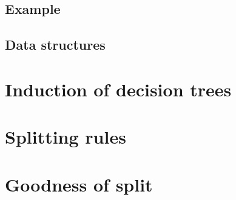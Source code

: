 


\subsection{Example}


\subsection{Data structures}




\section{Induction of decision trees}
\label{sec:3:induction}


\section{Splitting rules}
\label{sec:3:splitting-rules}


\section{Goodness of split}
\label{sec:3:criteria}

